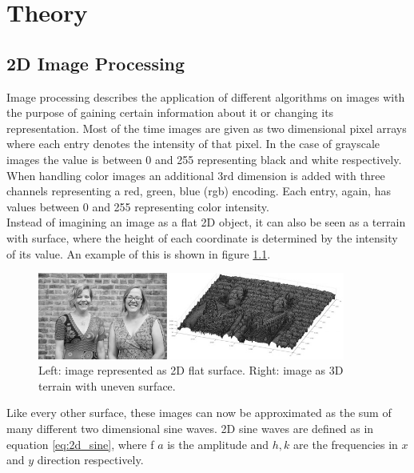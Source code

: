 \chapter{Theory}
\label{chap:theory}

\section{2D Image Processing}

Image processing describes the application of different algorithms on images with the purpose of gaining certain information about it or changing its representation. Most of the time images are given as two dimensional pixel arrays where each entry denotes the intensity of that pixel. In the case of grayscale images the value is between 0 and 255 representing black and white respectively. When handling color images an additional 3rd dimension is added with three channels representing a red, green, blue (rgb) encoding. Each entry, again, has values between 0 and 255 representing color intensity. \\
Instead of imagining an image as a flat 2D object, it can also be seen as a terrain with surface, where the height of each coordinate is determined by the intensity of its value. An example of this is shown in figure \ref{fig:image_surfaces}. 


\begin{figure}[!htb]
	\centering
	\includegraphics[width = 0.9\textwidth]{images/image_surfaces.jpg}
	\caption{Left: image represented as 2D flat surface. Right: image as 3D terrain with uneven surface. \protect\footnotemark}
	\label{fig:image_surfaces}
\end{figure}



Like every other surface, these images can now be approximated as the sum of many different two dimensional sine waves. 2D sine waves are defined as in equation \ref{eq:2d_sine}, where f $a$ is the amplitude and $h, k$ are the frequencies in $x$ and $y$ direction respectively.


